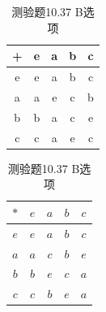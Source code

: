 \documentclass[UTF8, heading=true]{ctexart}
\begin{document}
\begin{table}[H]
  \centering
  \renewcommand{\arraystretch}{1.3}
  \begin{minipage}{0.45\textwidth}
    \centering
    \begin{tabular}{c|cccc}
      \hline
      + & e & a & b & c \\
      \hline
      e & e & a & b & c \\
      a & a & e & c & b \\
      b & b & a & c & e \\
      c & c & a & e & c \\
      \hline
    \end{tabular}
    \vspace{0.5cm}
    \caption{测验题10.37 A选项}
  \end{minipage}
  \hspace{0.05\textwidth}
  \begin{minipage}{0.45\textwidth}
    \centering
    \begin{tabular}{c|cccc}
      \hline
      $*$ & $e$ & $a$ & $b$ & $c$ \\
      \hline
      $e$ & $e$ & $a$ & $b$ & $c$ \\
      $a$ & $a$ & $c$ & $b$ & $e$ \\
      $b$ & $b$ & $e$ & $c$ & $a$ \\
      $c$ & $c$ & $b$ & $e$ & $a$ \\
      \hline
    \end{tabular}
    \vspace{0.5cm}
    \caption{测验题10.37 B选项}
  \end{minipage}
\end{table}
\end{document}
